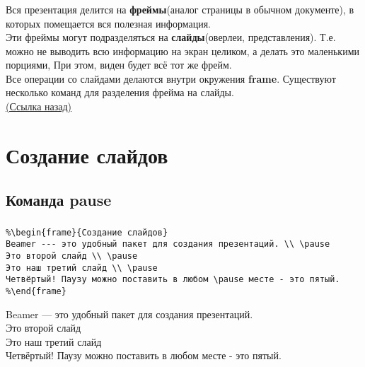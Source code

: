 \documentclass[aspectratio=169,
]{beamer}
\begin{document}
\begin{frame}[label=f4]
\frametitle{\insertsection}
\framesubtitle{\insertsubsection}

Вся презентация делится на \textbf{фреймы}(аналог страницы в обычном документе), в которых помещается вся полезная информация. \\
Эти фреймы могут подразделяться на \textbf{слайды}(оверлеи, представления). Т.е. можно не выводить всю информацию на экран целиком, \pause а делать это \pause  маленькими \pause порциями, \pause {}  \pause При этом, виден будет всё тот же фрейм. \pause \\
Все операции со слайдами делаются внутри окружения \textbf{frame}. Существуют несколько команд для разделения фрейма на слайды. \\
\label<7>{f4_7} \hyperlink{f16_3}{(Ссылка назад)}
\end{frame}



\section{Создание слайдов}
\subsection{Команда pause}

\begin{frame}[fragile, label=f5]
\frametitle{\insertsection}
\framesubtitle{\insertsubsection}

\begin{verbatim}
%\begin{frame}{Создание слайдов}
Beamer --- это удобный пакет для создания презентаций. \\ \pause 
Это второй слайд \\ \pause 
Это наш третий слайд \\ \pause 
Четвёртый! Паузу можно поставить в любом \pause месте - это пятый.
%\end{frame}
\end{verbatim} \pause

Beamer ---  это удобный пакет для создания презентаций. \\ \pause
Это второй слайд \\ \pause
Это наш третий слайд \\ \pause
Четвёртый! Паузу можно поставить в любом \pause месте - это пятый.
\end{frame}
\end{document}
